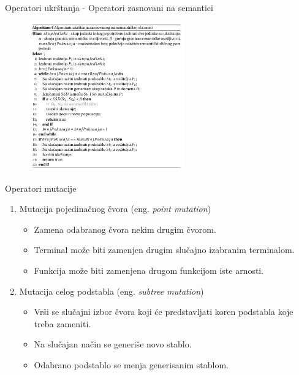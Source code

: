 \documentclass{beamer}
\begin{document}
\begin{frame}{Operatori ukrštanja - Operatori zasnovani na semantici}
\begin{figure}[!ht]
\begin{center}
\includegraphics[width=0.6\textwidth]{images/ssc_alg.png}
\end{center}
\label{fig:sac1}
\end{figure} 
\end{frame}

\begin{frame}{Operatori mutacije}
\begin{enumerate}
    \item Mutacija pojedinačnog čvora (eng. \textit{point mutation})
    \begin{itemize}
        \item Zamena odabranog čvora nekim drugim čvorom.
        \item Terminal može biti zamenjen drugim slučajno izabranim terminalom.
        \item Funkcija može biti zamenjena drugom funkcijom iste arnosti.
    \end{itemize}
    
    \item Mutacija celog podstabla (eng. \textit{subtree mutation})
    \begin{itemize}
        \item Vrši se slučajni izbor čvora koji će predstavljati koren podstabla koje treba zameniti.
        \item Na slučajan način se generiše novo stablo.
        \item Odabrano podstablo se menja generisanim stablom. 
    \end{itemize}

\end{enumerate}
\end{frame}
\end{document}
